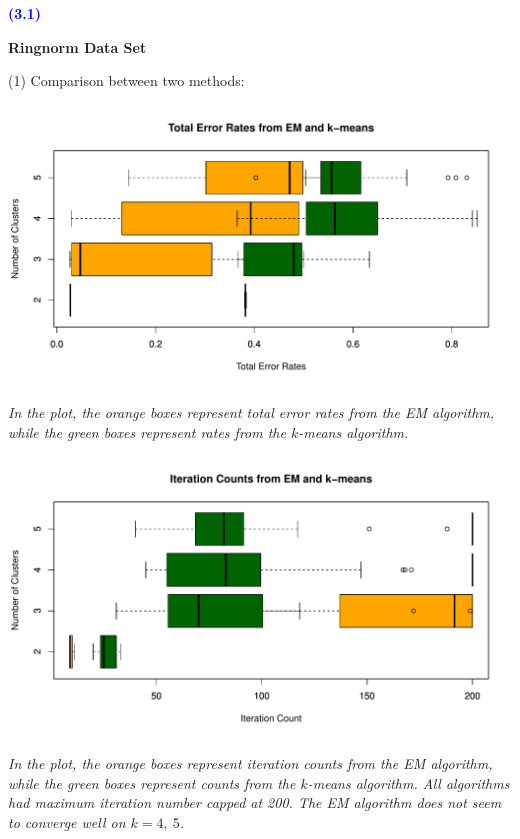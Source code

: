 \documentclass[a4paper,12pt]{article}
\newcommand{\qnum}[1]{\noindent\textcolor{blue}{\textbf{(#1)}}}
\begin{document}
\qnum{3.1}
\begin{center}
    \textcolor{mydarkgreen}{\textbf{Ringnorm Data Set}}
\end{center}
\bigskip

\noindent (1) Comparison between two methods:

\begin{center}
  \includegraphics[width=0.9\linewidth]{Image/Prob3-TotalErr-Ringnorm-Both.pdf}
  
   \parbox{0.9\textwidth}{\textit{In the plot, the \textcolor{myorange}{orange boxes} represent total error rates from the EM algorithm, while the \textcolor{mydarkgreen}{green boxes} represent rates from the $k$-means algorithm.
  }}
\end{center}
\bigskip

\begin{center}
  \includegraphics[width=0.9\linewidth]{Image/Prob3-ItrCount-Ringnorm-Both.pdf}
  
   \parbox{0.9\textwidth}{\textit{In the plot, the \textcolor{myorange}{orange boxes} represent iteration counts from the EM algorithm, while the \textcolor{mydarkgreen}{green boxes} represent counts from the $k$-means algorithm. 
   All algorithms had maximum iteration number capped at 200. The EM algorithm does not seem to converge well on $k = 4,\ 5$.
  }}
\end{center}
\bigskip
\end{document}
